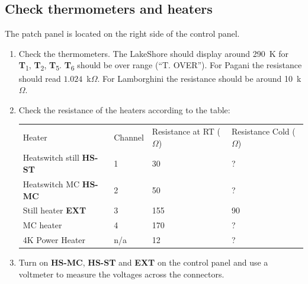 \documentclass{article}[18pt,A4]
\newcommand{\thing}[1]{{\color{gray}\textsc{ \textbf{#1}}}}
\newcommand{\temperature}[1]{{\color{temperaturecolor}\textbf{T}\textsubscript{#1}}}
\begin{document}
\subsection{Check thermometers and heaters}
The patch panel is located on the right side of the control panel.
\begin{enumerate}
    \item Check the thermometers. The LakeShore should display around 290~K for \temperature{1}, \temperature{2}, \temperature{5}.
    \temperature{6} should be over range (``T. OVER'').
For Pagani the resistance should read $1.024$~k$\Omega$.
For Lamborghini the resistance should be around 10~k$\Omega$.
    \item Check the resistance of the heaters according to the table:

        \begin{tabular}{llll}
        \color{subsectioncolor} Heater  & \color{subsectioncolor} Channel & \color{subsectioncolor} Resistance at RT ($\Omega$) & \color{subsectioncolor}  Resistance Cold ($\Omega$) \\[0.2em]
        Heatswitch still \thing{HS-ST} & 1       & 30                          & ?                          \\
        Heatswitch MC \thing{HS-MC}    & 2       & 50                          & ?                          \\
        Still heater \thing{EXT}       & 3       & 155                         & 90                         \\
        MC heater                      & 4       & 170                         & ?                          \\
        4K Power Heater                & n/a     & 12                          & ?                         
        \end{tabular}
    
    \item Turn on \thing{HS-MC}, \thing{HS-ST} and \thing{EXT} on the control panel and use a voltmeter to measure the voltages across the connectors.
    
\end{enumerate}
\end{document}
